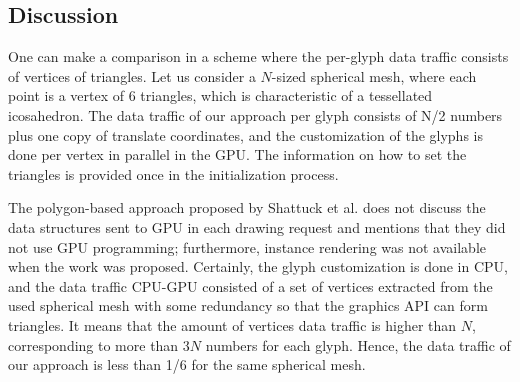 \documentclass[twoside,twocolumn,10pt]{article}
\begin{document}

\subsection{Discussion}

One can make a comparison in a scheme where the per-glyph data traffic consists of vertices of triangles. Let us consider a $N$-sized spherical mesh, where each point is a vertex of 6 triangles, which is characteristic of a tessellated icosahedron. The data traffic of our approach per glyph consists of N/2 numbers plus one copy of translate coordinates, and the customization of the glyphs is done per vertex in parallel in the GPU. The information on how to set the triangles is provided once in the initialization process.

The polygon-based approach proposed by Shattuck et al. \cite{shattuck2008} does not discuss the data structures sent to GPU in each drawing request and mentions that they did not use GPU programming; furthermore, instance rendering was not available when the work was proposed. Certainly, the glyph customization is done in CPU, and the data traffic CPU-GPU consisted of a set of vertices extracted from the used spherical mesh with some redundancy so that the graphics API can form triangles. It means that the amount of vertices data traffic is higher than $N$, corresponding to more than $3N$ numbers for each glyph. Hence, the data traffic of our approach is less than 1/6 for the same spherical mesh.



\end{document}
